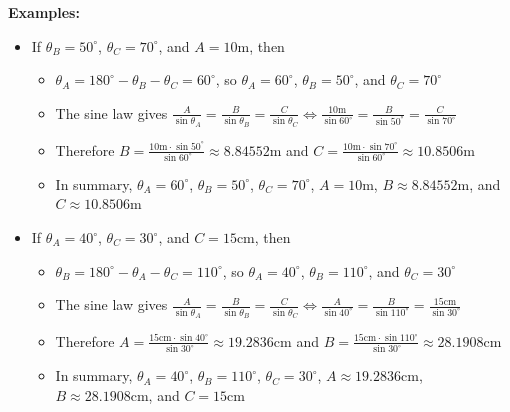 \documentclass{article}
\begin{document}
{\bf Examples:}
\begin{itemize}
\item If \(\theta_B = 50^\circ\), \(\theta_C = 70^\circ\), and \(A = 10\text{m}\), then
	\begin{itemize}
	\item[\textasteriskcentered] \(\theta_A = 180^\circ - \theta_B - \theta_C = 60^\circ\), so \(\theta_A = 60^\circ\), \(\theta_B = 50^\circ\), and \(\theta_C = 70^\circ\)
	\item[\textasteriskcentered] The sine law gives \(\frac{A}{\sin\theta_A} = \frac{B}{\sin\theta_B} = \frac{C}{\sin\theta_C} \iff \frac{10\text{m}}{\sin 60^\circ} = \frac{B}{\sin 50^\circ} = \frac{C}{\sin 70^\circ}\)
	\item[\textasteriskcentered] Therefore \(B = \frac{10\text{m} \cdot \sin 50^\circ}{\sin 60^\circ} \approx 8.84552\text{m}\) and \(C = \frac{10\text{m} \cdot \sin 70^\circ}{\sin 60^\circ} \approx 10.8506\text{m}\)
	\item[\textasteriskcentered] In summary, \(\theta_A = 60^\circ\), \(\theta_B = 50^\circ\), \(\theta_C = 70^\circ\), \(A = 10\text{m}\), \(B \approx 8.84552\text{m}\), and \(C \approx 10.8506\text{m}\)
	\end{itemize} 
\item If \(\theta_A = 40^\circ\), \(\theta_C = 30^\circ\), and \(C = 15\text{cm}\), then
	\begin{itemize}
	\item[\textasteriskcentered] \(\theta_B = 180^\circ - \theta_A - \theta_C = 110^\circ\), so \(\theta_A = 40^\circ\), \(\theta_B = 110^\circ\), and \(\theta_C = 30^\circ\)
	\item[\textasteriskcentered] The sine law gives \(\frac{A}{\sin\theta_A} = \frac{B}{\sin\theta_B} = \frac{C}{\sin\theta_C} \iff \frac{A}{\sin 40^\circ} = \frac{B}{\sin 110^\circ} = \frac{15\text{cm}}{\sin 30^\circ}\)
	\item[\textasteriskcentered] Therefore \(A = \frac{15\text{cm} \cdot \sin 40^\circ}{\sin 30^\circ} \approx 19.2836\text{cm}\) and \(B = \frac{15\text{cm} \cdot \sin 110^\circ}{\sin 30^\circ} \approx 28.1908\text{cm}\)
	\item[\textasteriskcentered] In summary, \(\theta_A = 40^\circ\), \(\theta_B = 110^\circ\), \(\theta_C = 30^\circ\), \(A \approx 19.2836\text{cm}\), \(B \approx 28.1908\text{cm}\), and \(C = 15\text{cm}\)
	\end{itemize} 
\end{itemize}
\end{document}
